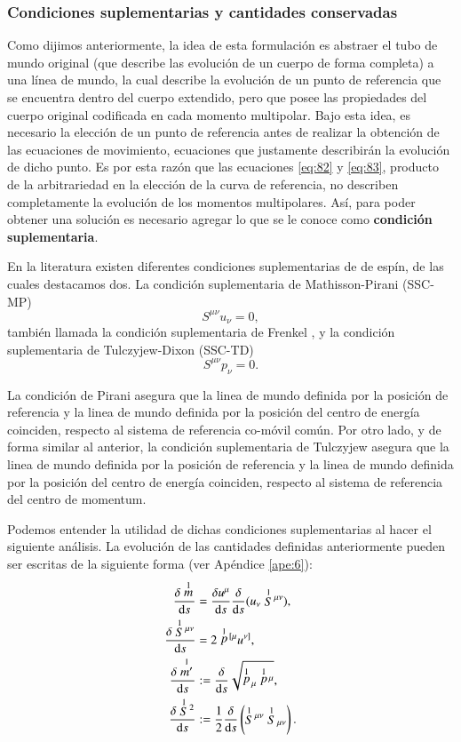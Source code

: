 \subsubsection{Condiciones suplementarias y cantidades conservadas}

Como dijimos anteriormente, la idea de esta formulación es abstraer el tubo de mundo original (que describe las evolución de un cuerpo de forma completa) a una línea de mundo, la cual describe la evolución de un punto de referencia que se encuentra dentro del cuerpo extendido, pero que posee las propiedades del cuerpo original codificada en cada momento multipolar. Bajo esta idea, es necesario la elección de un punto de referencia antes de realizar la obtención de las ecuaciones de movimiento, ecuaciones que justamente describirán la evolución de dicho punto. Es por esta razón que las ecuaciones \eqref{eq:82} y \eqref{eq:83}, producto de la arbitrariedad en la elección de la curva de referencia, no describen completamente la evolución de los momentos multipolares. Así, para poder obtener una solución es necesario agregar lo que se le conoce como \textbf{condición suplementaria}.

En la literatura existen diferentes condiciones suplementarias de de espín, de las cuales destacamos dos. La condición suplementaria de Mathisson-Pirani  (SSC-MP)
\begin{equation}
\label{eq:sscmp}
S^{\mu \nu} u_{\nu} = 0,
\end{equation}
también llamada la condición suplementaria de Frenkel \cite{Steinhoff-Puetzfeld}, y la condición suplementaria de Tulczyjew-Dixon (SSC-TD)
\begin{equation}
\label{eq:ssctd}
S^{\mu \nu} p_{\nu} = 0.
\end{equation}

La condición de Pirani asegura que la linea de mundo definida por la posición de referencia y la linea de mundo definida por la posición del centro de energía coinciden, respecto al sistema de referencia co-móvil común. Por otro lado, y de forma similar al anterior, la condición suplementaria de Tulczyjew asegura que la linea de mundo definida por la posición de referencia y la linea de mundo definida por la posición del centro de energía coinciden, respecto al sistema de referencia del centro de momentum.

Podemos entender la utilidad de dichas condiciones suplementarias al hacer el siguiente análisis. La evolución de las cantidades definidas anteriormente pueden ser escritas de la siguiente forma (ver Apéndice \ref{ape:6}):
\begin{align}
\label{eq:45}
\cd{\des{1}{m}} &= \cd{u^{\mu}} \cd{}(u_{\nu} \des{1}{S}^{\mu \nu}),\\
\label{eq:103}
\cd{\des{1}{S}^{\mu \nu}} &= 2 \des{1}{p}^{[\mu} u^{\nu]},\\
\label{eq:46}
\cd{\des{1}{m'}} &:= \cd{}\sqrt{\des{1}{p}_{\mu}\des{1}{p}^{\mu}},\\
\label{eq:47}
\cd{\des{1}{S}^2} &:= \frac{1}{2} \cd{} \left( \des{1}{S}^{\mu \nu} \des{1}{S}_{\mu \nu} \right).
\end{align}

